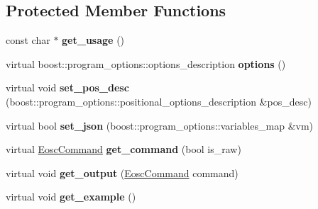 \subsection*{Protected Member Functions}
\begin{DoxyCompactItemize}
\item 
\mbox{\label{classtokenika_1_1eosc_1_1_get_block_options_aed0e156ee7251256d9b52a07f590c0d3}} 
const char $\ast$ {\bfseries get\+\_\+usage} ()
\item 
\mbox{\label{classtokenika_1_1eosc_1_1_get_block_options_a6e8c1a240e5a529c093e0053f12e9ee5}} 
virtual boost\+::program\+\_\+options\+::options\+\_\+description {\bfseries options} ()
\item 
\mbox{\label{classtokenika_1_1eosc_1_1_get_block_options_a8455d8ad48f073736576dc6b74de664d}} 
virtual void {\bfseries set\+\_\+pos\+\_\+desc} (boost\+::program\+\_\+options\+::positional\+\_\+options\+\_\+description \&pos\+\_\+desc)
\item 
\mbox{\label{classtokenika_1_1eosc_1_1_get_block_options_a0e2e25029e13410b7ca60369818d0789}} 
virtual bool {\bfseries set\+\_\+json} (boost\+::program\+\_\+options\+::variables\+\_\+map \&vm)
\item 
\mbox{\label{classtokenika_1_1eosc_1_1_get_block_options_ac391b4b079f7e461e9413c68c3ab3ae5}} 
virtual \hyperlink{classtokenika_1_1eosc_1_1_eosc_command}{Eosc\+Command} {\bfseries get\+\_\+command} (bool is\+\_\+raw)
\item 
\mbox{\label{classtokenika_1_1eosc_1_1_get_block_options_ac7eb6dfe97da31f169f21862f6fe84ea}} 
virtual void {\bfseries get\+\_\+output} (\hyperlink{classtokenika_1_1eosc_1_1_eosc_command}{Eosc\+Command} command)
\item 
\mbox{\label{classtokenika_1_1eosc_1_1_get_block_options_a609df79f796fc08b357d81632869fc6a}} 
virtual void {\bfseries get\+\_\+example} ()
\end{DoxyCompactItemize}
